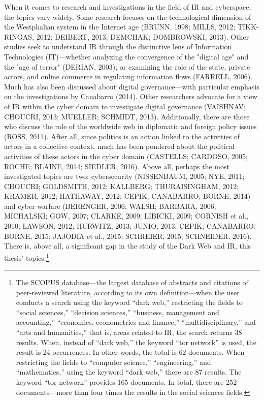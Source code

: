 When it comes to research and investigations in the field of IR and cyberspace, the topics vary widely. Some research focuses on the technological dimension of the Westphalian system in the Internet age (BRUNN, 1998; MILLS, 2012; TIKK-RINGAS, 2012; DEIBERT, 2013; DEMCHAK; DOMBROWSKI, 2013). Other studies seek to understand IR through the distinctive lens of Information Technologies (IT)—whether analyzing the convergence of the "digital age" and the "age of terror" (DERIAN, 2003); or examining the role of the state, private actors, and online commerce in regulating information flows (FARRELL, 2006). Much has also been discussed about digital governance—with particular emphasis on the investigations by Canabarro (2014). Other researchers advocate for a view of IR within the cyber domain to investigate digital governance (VAISHNAV; CHOUCRI, 2013; MUELLER; SCHMIDT, 2013). Additionally, there are those who discuss the role of the worldwide web in diplomatic and foreign policy issues (ROSS, 2011). After all, since politics is an action linked to the activities of actors in a collective context, much has been pondered about the political activities of these actors in the cyber domain (CASTELLS; CARDOSO, 2005; ROCHE; BLAINE, 2014; SIEDLER, 2016).
Above all, perhaps the most investigated topics are two: cybersecurity (NISSENBAUM, 2005; NYE, 2011; CHOUCRI; GOLDSMITH, 2012; KALLBERG; THURAISINGHAM, 2012; KRAMER, 2012; HATHAWAY, 2012; CEPIK; CANABARRO; BORNE, 2014) and cyber warfare (BERENGER, 2006; WALSH; BARBARA, 2006; MICHALSKI; GOW, 2007; CLARKE, 2009; LIBICKI, 2009; CORNISH et al., 2010; LAWSON, 2012; HURWITZ, 2013; JUNIO, 2013; CEPIK; CANABARRO; BORNE, 2015; JAJODIA et al., 2015; SCHREIER, 2015; SCHNEIDER, 2016). There is, above all, a significant gap in the study of the Dark Web and IR, this thesis' topics.\footnote{The SCOPUS database—the largest database of abstracts and citations of peer-reviewed literature, according to its own definition—when the user conducts a search using the keyword “dark web,” restricting the fields to “social sciences,” “decision sciences,” “business, management and accounting,” “economics, econometrics and finance,” “multidisciplinary,” and “arts and humanities,” that is, areas related to IR, the search returns 38 results. When, instead of “dark web,” the keyword “tor network” is used, the result is 24 occurrences. In other words, the total is 62 documents. When restricting the fields to “computer science,” “engineering,” and “mathematics,” using the keyword “dark web,” there are 87 results. The keyword “tor network” provides 165 documents. In total, there are 252 documents—more than four times the results in the social sciences fields.}

